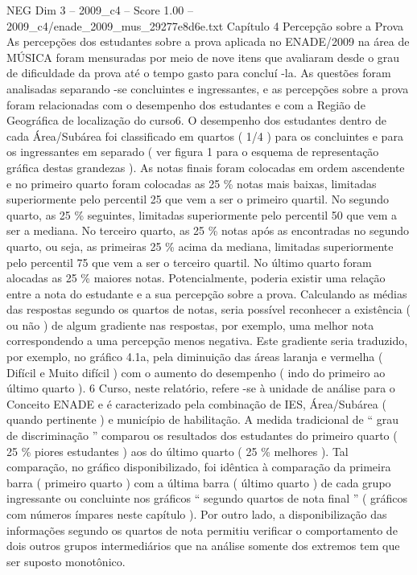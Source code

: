 \begin{textsample}{NEG Dim 3 – 2009\_c4 – Score 1.00 – 2009\_c4/enade\_2009\_mus\_29277e8d6e.txt}  \label{ex:f3_neg_159}
Capítulo 4 Percepção sobre a Prova As percepções dos estudantes sobre a prova aplicada no ENADE/2009 na área de MÚSICA foram mensuradas por meio de nove itens que avaliaram desde o grau de dificuldade da prova até o tempo gasto para concluí -la.
As questões foram analisadas separando -se concluintes e ingressantes, e as percepções sobre a prova foram relacionadas com o desempenho dos estudantes e com a Região de Geográfica de localização do curso6.
O desempenho dos estudantes dentro de cada Área/Subárea foi classificado em quartos ( 1/4 ) para os concluintes e para os ingressantes em separado ( ver figura 1 para o esquema de representação gráfica destas grandezas ).
As notas finais foram colocadas em ordem ascendente e no primeiro quarto foram colocadas as 25 \% notas mais baixas, limitadas superiormente pelo percentil 25 que vem a ser o primeiro quartil.
No segundo quarto, as 25 \% seguintes, limitadas superiormente pelo percentil 50 que vem a ser a mediana.
No terceiro quarto, as 25 \% notas após as encontradas no segundo quarto, ou seja, as primeiras 25 \% acima da mediana, limitadas superiormente pelo percentil 75 que vem a ser o terceiro quartil.
No último quarto foram alocadas as 25 \% maiores notas.
Potencialmente, poderia existir uma relação entre a nota do estudante e a sua percepção sobre a prova.
Calculando as médias das respostas segundo os quartos de notas, seria possível reconhecer a existência ( ou não ) de algum gradiente nas respostas, por exemplo, uma melhor nota correspondendo a uma percepção menos negativa.
Este gradiente seria traduzido, por exemplo, no gráfico 4.1a, pela diminuição das áreas laranja e vermelha ( Difícil e Muito difícil ) com o aumento do desempenho ( indo do primeiro ao último quarto ). 6 Curso, neste relatório, refere -se à unidade de análise para o Conceito ENADE e é caracterizado pela combinação de IES, Área/Subárea ( quando pertinente ) e município de habilitação.
A medida tradicional de “ grau de discriminação ” comparou os resultados dos estudantes do primeiro quarto ( 25 \% piores estudantes ) aos do último quarto ( 25 \% melhores ).
Tal comparação, no gráfico disponibilizado, foi idêntica à comparação da primeira barra ( primeiro quarto ) com a última barra ( último quarto ) de cada grupo ingressante ou concluinte nos gráficos “ segundo quartos de nota final ” ( gráficos com números ímpares neste capítulo ).
Por outro lado, a disponibilização das informações segundo os quartos de nota permitiu verificar o comportamento de dois outros grupos intermediários que na análise somente dos extremos tem que ser suposto monotônico.

\end{textsample}
